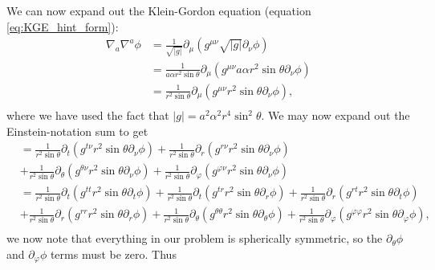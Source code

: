 \documentclass[12pt]{article}
\numberwithin{equation}{section}
\begin{document}
We can now expand out the Klein-Gordon equation (equation \ref{eq:KGE_hint_form}):
\begin{equation} \label{eq:KGE_expanded}
\begin{aligned}
\nabla_a \nabla^a \phi &= \frac{1}{\sqrt{|g|}} \partial_\mu (g^{\mu \nu} \sqrt{|g|} \partial_\nu \phi) \\
&= \frac{1}{a \alpha r^2 \sin \theta} \partial_\mu (g^{\mu \nu} a \alpha r^2 \sin \theta \partial_\nu \phi) \\
&= \frac{1}{r^2 \sin \theta} \partial_\mu (g^{\mu \nu} r^2 \sin \theta \partial_\nu \phi), \\
\end{aligned}
\end{equation}
where we have used the fact that $|g| = a^2 \alpha^2 r^4 \sin^2 \theta$.  We may now expand out the Einstein-notation sum to get
\begin{equation*}
\begin{aligned}
&= \frac{1}{r^2 \sin \theta} \partial_t (g^{t \nu} r^2 \sin \theta \partial_\nu \phi) + \frac{1}{r^2 \sin \theta} \partial_r (g^{r \nu} r^2 \sin \theta \partial_\nu \phi) \\
&+ \frac{1}{r^2 \sin \theta} \partial_\theta (g^{\theta \nu} r^2 \sin \theta \partial_\nu \phi) + \frac{1}{r^2 \sin \theta} \partial_\varphi (g^{\varphi \nu} r^2 \sin \theta \partial_\nu \phi)\\
&= \frac{1}{r^2 \sin \theta} \partial_t (g^{t t} r^2 \sin \theta \partial_t \phi) + \frac{1}{r^2 \sin \theta} \partial_t (g^{t r} r^2 \sin \theta \partial_r \phi) + \frac{1}{r^2 \sin \theta} \partial_r (g^{r t} r^2 \sin \theta \partial_t \phi) \\
&+ \frac{1}{r^2 \sin \theta} \partial_r (g^{r r} r^2 \sin \theta \partial_r \phi) + \frac{1}{r^2 \sin \theta} \partial_\theta (g^{\theta \theta} r^2 \sin \theta \partial_\theta \phi) + \frac{1}{r^2 \sin \theta} \partial_\varphi (g^{\varphi \varphi} r^2 \sin \theta \partial_\varphi \phi), \\
\end{aligned}
\end{equation*}
we now note that everything in our problem is spherically symmetric, so the $\partial_\theta \phi$ and $\partial_\varphi \phi$ terms must be zero.  Thus
\end{document}
